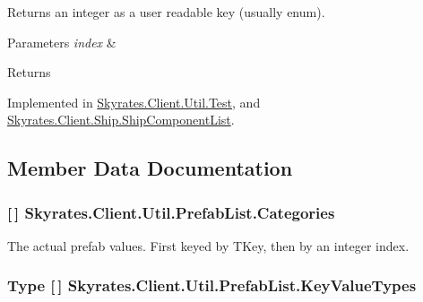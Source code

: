 Returns an integer as a user readable key (usually enum). 


\begin{DoxyParams}{Parameters}
{\em index} & \\
\hline
\end{DoxyParams}
\begin{DoxyReturn}{Returns}

\end{DoxyReturn}


Implemented in \hyperlink{class_skyrates_1_1_client_1_1_util_1_1_test_a6dfcf2dbe2aa97e9f193c09085a86d75}{Skyrates.\-Client.\-Util.\-Test}, and \hyperlink{class_skyrates_1_1_client_1_1_ship_1_1_ship_component_list_a85071fae3afe111dc7e0c55d2adbb943}{Skyrates.\-Client.\-Ship.\-Ship\-Component\-List}.



\subsection{Member Data Documentation}
\hypertarget{class_skyrates_1_1_client_1_1_util_1_1_prefab_list_ac7e03e13d80aa784f26ca91dc37c59f0}{
\subsubsection[{Categories}]{ \mbox{[}$\,$\mbox{]} Skyrates.\-Client.\-Util.\-Prefab\-List.\-Categories}}\label{class_skyrates_1_1_client_1_1_util_1_1_prefab_list_ac7e03e13d80aa784f26ca91dc37c59f0}


The actual prefab values. First keyed by T\-Key, then by an integer index. 

\hypertarget{class_skyrates_1_1_client_1_1_util_1_1_prefab_list_a1f0c9a7b7682fcc2ec806eb6a61aeeaa}{
\subsubsection[{Key\-Value\-Types}]{\setlength{\rightskip}{0pt plus 5cm}Type \mbox{[}$\,$\mbox{]} Skyrates.\-Client.\-Util.\-Prefab\-List.\-Key\-Value\-Types}}\label{class_skyrates_1_1_client_1_1_util_1_1_prefab_list_a1f0c9a7b7682fcc2ec806eb6a61aeeaa}


